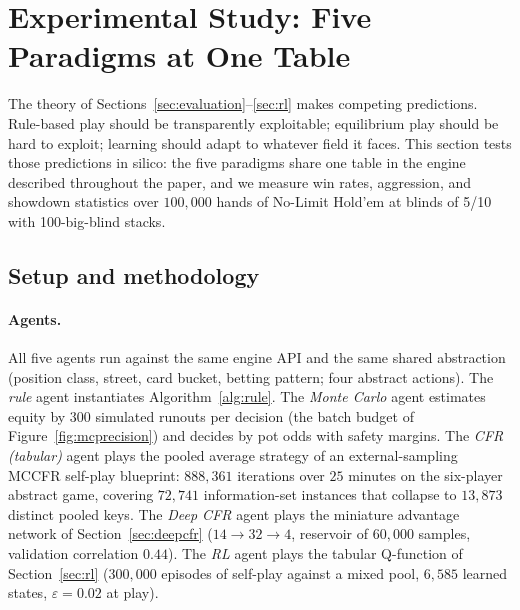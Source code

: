 \section{Experimental Study: Five Paradigms at One Table}\label{sec:experiments}

The theory of Sections~\ref{sec:evaluation}--\ref{sec:rl} makes competing predictions. Rule-based play should be transparently exploitable; equilibrium play should be hard to exploit; learning should adapt to whatever field it faces. This section tests those predictions in silico: the five paradigms share one table in the engine described throughout the paper, and we measure win rates, aggression, and showdown statistics over $100{,}000$ hands of No-Limit Hold'em at blinds of 5/10 with 100-big-blind stacks.

\subsection{Setup and methodology}\label{sec:expsetup}

\paragraph{Agents.} All five agents run against the same engine API and the same shared abstraction (position class, street, card bucket, betting pattern; four abstract actions). The \emph{rule} agent instantiates Algorithm~\ref{alg:rule}. The \emph{Monte Carlo} agent estimates equity by $300$ simulated runouts per decision (the batch budget of Figure~\ref{fig:mcprecision}) and decides by pot odds with safety margins. The \emph{CFR (tabular)} agent plays the pooled average strategy of an external-sampling MCCFR self-play blueprint: $888{,}361$ iterations over $25$ minutes on the six-player abstract game, covering $72{,}741$ information-set instances that collapse to $13{,}873$ distinct pooled keys. The \emph{Deep CFR} agent plays the miniature advantage network of Section~\ref{sec:deepcfr} ($14 \to 32 \to 4$, reservoir of $60{,}000$ samples, validation correlation $0.44$). The \emph{RL} agent plays the tabular Q-function of Section~\ref{sec:rl} ($300{,}000$ episodes of self-play against a mixed pool, $6{,}585$ learned states, $\varepsilon = 0.02$ at play).


